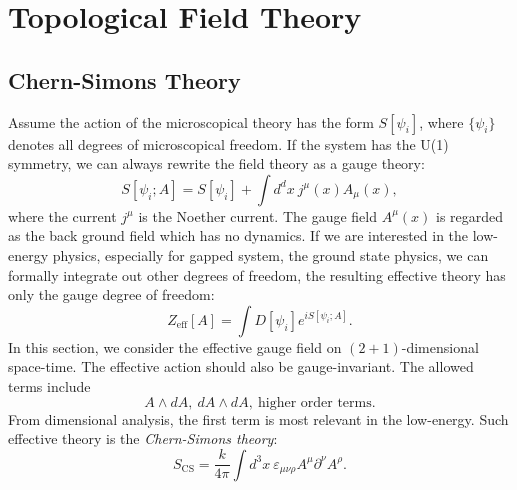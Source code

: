 \chapter{Topological Field Theory}

\section{Chern-Simons Theory}
Assume the action of the microscopical theory has the form $S[\psi_i]$, where $\{\psi_i\}$ denotes all degrees of microscopical freedom.
If the system has the U(1) symmetry, we can always rewrite the field theory as a gauge theory:
\begin{equation}
	S[\psi_i; A] = S[\psi_i] + \int d^dx\ j^\mu(x) A_\mu(x),
\end{equation}
where the current $j^\mu$ is the Noether current.
The gauge field $A^\mu(x)$ is regarded as the back ground field which has no dynamics.
If we are interested in the low-energy physics, especially for gapped system, the ground state physics, we can formally integrate out other degrees of freedom, the resulting effective theory has only the gauge degree of freedom:
\begin{equation}
	Z_{\mathrm{eff}}[A] = \int D[\psi_i] e^{i S[\psi_i;A]}.
\end{equation}
In this section, we consider the effective gauge field on $(2+1)$-dimensional space-time.
The effective action should also be gauge-invariant.
The allowed terms include
\begin{equation*}
	A \wedge dA,\ dA \wedge dA,\ \text{higher order terms}.
\end{equation*}
From dimensional analysis, the first term is most relevant in the low-energy.
Such effective theory is the \textit{Chern-Simons theory}:
\begin{equation}
	S_{\mathrm{CS}} = \frac{k}{4\pi}\int d^3 x\ \varepsilon_{\mu\nu\rho} A^\mu \partial^\nu A^\rho.
\end{equation}
